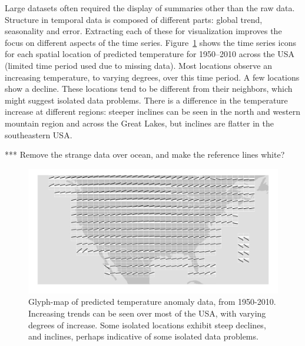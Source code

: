 \documentclass[oneside]{article}
\begin{document}
Large datasets often required the display of summaries other than the raw data. Structure in temporal data is composed of different parts: global trend, seasonality and error. Extracting each of these for visualization improves the focus on different aspects of the time series. Figure~\ref{fig:gistemp-pred} shows the time series icons for each spatial location of predicted temperature for 1950--2010 across the USA (limited time period used due to missing data). Most locations observe an increasing temperature, to varying degrees, over this time period. A few locations show a decline. These locations tend to be different from their neighbors, which might suggest isolated data problems. There is a difference in the temperature increase at different regions: steeper inclines can be seen in the north and western mountain region and across the Great Lakes, but inclines are flatter in the southeastern USA.

*** Remove the strange data over ocean, and make the reference lines white?

\begin{figure}[htbp]
  \centering
  \includegraphics[width=1\linewidth]{gistemp-pred}%

  \caption{Glyph-map of predicted temperature anomaly data, from
    1950-2010. Increasing trends can be seen over most of the USA,
    with varying degrees of increase. Some isolated locations exhibit
    steep declines, and inclines, perhaps indicative of some isolated
    data problems.}
  \label{fig:gistemp-pred}
\end{figure}


\end{document}
